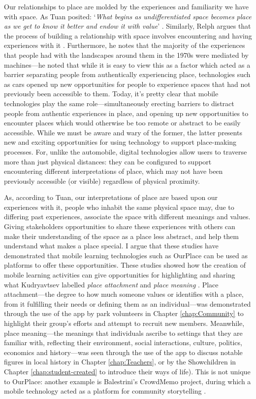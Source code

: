 Our relationships to place are molded by the experiences and familiarity we have with space. As Tuan posited: `\textit{What begins as undifferentiated space becomes place as we get to know it better and endow it with value}' \citep{Tuan1978}. Similarly, Relph argues that the process of building a relationship with space involves encountering and having experiences with it \citep{Relph1976}. Furthermore, he notes that the majority of the experiences that people had with the landscapes around them in the 1970s were mediated by machines---he noted that while it is easy to view this as a factor which acted as a barrier separating people from authentically experiencing place, technologies such as cars opened up new opportunities for people to experience spaces that had not previously been accessible to them. Today, it's pretty clear that mobile technologies play the same role---simultaneously erecting barriers to distract people from authentic experiences in place, and opening up new opportunities to encounter places which would otherwise be too remote or abstract to be easily accessible. While we must be aware and wary of the former, the latter presents new and exciting opportunities for using technology to support place-making processes. For, unlike the automobile, digital technologies allow users to traverse more than just physical distances: they can be configured to support encountering different interpretations of place, which may not have been previously accessible (or visible) regardless of physical proximity.

As, according to Tuan, our interpretations of place are based upon our experiences with it, people who inhabit the same physical space may, due to differing past experiences, associate the space with different meanings and values. Giving stakeholders opportunities to share these experiences with others can make their understanding of the space as a place less abstract, and help them understand what makes a place special. I argue that these studies have demonstrated that mobile learning technologies such as OurPlace can be used as platforms to offer these opportunities.  These studies showed how the creation of mobile learning activities can give opportunities for highlighting and sharing what Kudryavtsev labelled \textit{place attachment} and \textit{place meaning} \citep{Kudryavtsev2012}. Place attachment---the degree to how much someone values or identifies with a place, from it fulfilling their needs or defining them as an individual---was demonstrated through the use of the app by park volunteers in Chapter \ref{chap:Community} to highlight their group's efforts and attempt to recruit new members. Meanwhile, place meaning---the meanings that individuals ascribe to settings that they are familiar with, reflecting their environment, social interactions, culture, politics, economics and history---was seen through the use of the app to discuss notable figures in local history in Chapter \ref{chap:Teachers}, or by the Showchildren in Chapter \ref{chap:student-created} to introduce their ways of life). This is not unique to OurPlace: another example is Balestrini's CrowdMemo project, during which a mobile technology acted as a platform for community storytelling \citep{Balestrini2014}.

